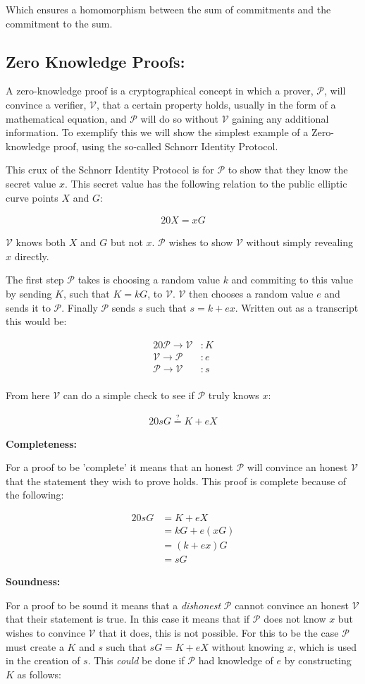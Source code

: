 \documentclass{article}
\newcommand{\eq}[1]{\begin{alignat*}{20}#1\end{alignat*}}
\newcommand{\V}{\mathcal{V}}
\renewcommand{\P}{\mathcal{P}}
\begin{document}
Which ensures a homomorphism between the sum of commitments and the
commitment to the sum.

\subsection{Zero Knowledge Proofs:}\label{zero-knowledge}

A zero-knowledge proof is a cryptographical concept in which a prover,
$\P$, will convince a verifier, $\V$, that a certain property holds,
usually in the form of a mathematical equation, and $\P$ will do so
without $\V$ gaining any additional information. To exemplify this we
will show the simplest example of a Zero-knowledge proof, using the
so-called Schnorr Identity Protocol.

This crux of the Schnorr Identity Protocol is for $\P$ to show that
they know the secret value $x$. This secret value has the following
relation to the public elliptic curve points $X$ and $G$:

\eq{
	X = xG
}

$\V$ knows both $X$ and $G$ but not $x$. $\P$ wishes to show $\V$
without simply revealing $x$ directly.

The first step $\P$ takes is choosing a random value $k$ and commiting
to this value by sending $K$, such that $K = kG$, to $\V$. $\V$ then
chooses a random value $e$ and sends it to $\P$. Finally $\P$ sends $s$
such that $s = k + ex$. Written out as a transcript this would be:

\eq{
	\P \rightarrow \V &: K \\
	\V \rightarrow \P &: e \\
	\P \rightarrow \V &: s \\
}

From here $\V$ can do a simple check to see if $\P$ truly knows $x$:

\eq{
	sG \stackrel{?}{=} K + eX
}


\textbf{Completeness:}

For a proof to be 'complete' it means that an honest $\P$ will convince
an honest $\V$ that the statement they wish to prove holds. This proof
is complete because of the following:

\eq{
	sG &= K + eX \\
	   &= kG + e(xG) \\
	   &= (k + ex)G \\
	   &= sG
}

\textbf{Soundness:}

For a proof to be sound it means that a \textit{dishonest} $\P$
cannot convince an honest $\V$ that their statement is true. In this
case it means that if $\P$ does not know $x$ but wishes to convince
$\V$ that it does, this is not possible. For this to be the case $\P$
must create a $K$ and $s$ such that $sG = K + eX$ without knowing $x$,
which is used in the creation of $s$. This \textit{could} be done if
$\P$ had knowledge of $e$ by constructing $K$ as follows:
\end{document}
